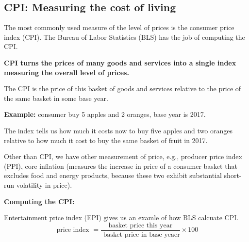 \documentclass[12pt]{article}
\begin{document}
\subsection{CPI: Measuring the cost of living}
The most commonly used measure of the level of prices is the consumer price index (CPI).
The Bureau of Labor Statistics (BLS) has the job of computing the CPI.

{\textbf {CPI turns the prices of many goods and services into a single index measuring
the overall level of prices.}}

The CPI is the price of this basket of goods and services relative to the price of 
the same basket in some base year.

{\textbf {Example:}} consumer buy 5 apples and 2 oranges, base year is 2017.

\begin{figure}[H]
\end{figure}

The index tells us how much it costs now to buy five apples and two
oranges relative to how much it cost to buy the same basket of fruit in 2017.

Other than CPI, we have other measurement of price, e.g., producer price index (PPI),
core inflation (measures the increase in price of a consumer basket that excludes 
food and energy products, because these two exhibit substantial short-run volatility
in price).


{\textbf {Computing the CPI:}}

\begin{figure}[H]
\end{figure}
Entertainment price index (EPI) gives us an examle of how BLS calcuate CPI.
\begin{equation*}
\text{ price index } = \frac{\text{ basket price this year }}{\text{ 
basket price in base yeaer}} \times 100
\end{equation*}
\end{document}
